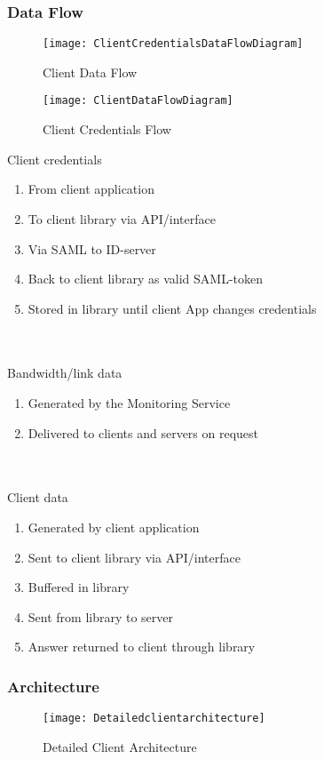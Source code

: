		
	\subsubsection{Data Flow}\label{textual client data flow}
        
    \begin{figure}[h]
        \centering
        \texttt{[image: ClientCredentialsDataFlowDiagram]}
        \caption{Client Data Flow}
        \label{fig:ClientCredentialsDataFlowDiagram}
    \end{figure}
    
    \begin{figure}[h]
        \centering
        \texttt{[image: ClientDataFlowDiagram]}
        \caption{Client Credentials Flow}
        \label{fig:ClientDataFlowDiagram}
    \end{figure}
    
		Client credentials
		\begin{enumerate}
			\item From client application
			\item To client library via API/interface
			\item Via SAML to ID-server
			\item Back to client library as valid SAML-token
			\item Stored in library until client App changes credentials
		\end{enumerate}
		\\\\
		Bandwidth/link data
		\begin{enumerate}
			\item Generated by the Monitoring Service
			\item Delivered to clients and servers on request
		\end{enumerate}
		\\\\
		Client data
		\begin{enumerate}
			\item Generated by client application
			\item Sent to client library via API/interface
			\item Buffered in library
			\item Sent from library to server
			\item Answer returned to client through library
		\end{enumerate}
		
	\subsubsection{Architecture}\label{client architecture}
		\begin{figure}[h]
			\centering	
			\texttt{[image: Detailedclientarchitecture]}
			\caption{Detailed Client Architecture}
			\label{fig:DetailedClientArchitecture}
		\end{figure}

